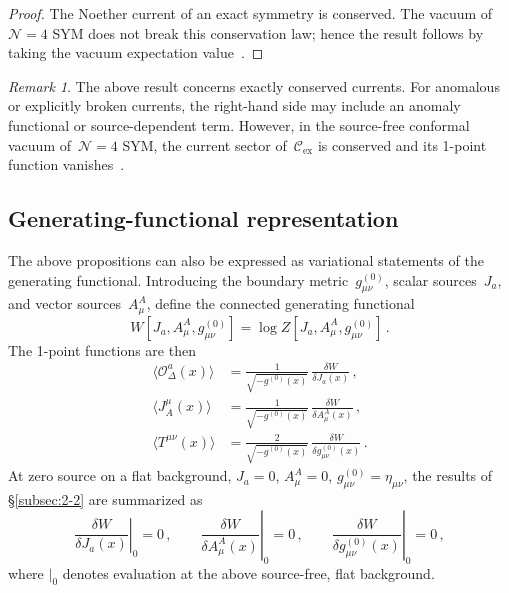 \documentclass[
  aps,
  prd,
  preprint,
  groupedaddress,
  nofootinbib,
  longbibliography
]{revtex4-2}
\theoremstyle{remark}
\newtheorem{remark}[definition]{Remark}
\newcommand{\Cex}{\mathcal{C}_{\mathrm{ex}}}
\newcommand{\N}{\mathcal{N}}
\begin{document}
\begin{proof}
The Noether current of an exact symmetry is conserved.
The vacuum of~$\N=4$ SYM does not break this conservation law;
hence the result follows by taking the vacuum expectation
value~\cite{ref4,ref6,ref7}.
\end{proof}

\begin{remark}\label{rem:anomalous-current}
The above result concerns exactly conserved currents.
For anomalous or explicitly broken currents, the right-hand side
may include an anomaly functional or source-dependent term.
However, in the source-free conformal vacuum of~$\N=4$ SYM,
the current sector of~$\Cex$ is conserved and its 1-point function
vanishes~\cite{ref4,ref6,ref7}.
\end{remark}

\subsection{Generating-functional representation}\label{subsec:2-3}

The above propositions can also be expressed as variational
statements of the generating functional.
Introducing the boundary metric~$g^{(0)}_{\mu\nu}$, scalar
sources~$J_a$, and vector sources~$A_\mu^A$, define the connected
generating functional~\cite{ref2,ref3,ref5}
\begin{equation}\label{eq:W-def}
  W[J_a,A_\mu^A,g^{(0)}_{\mu\nu}]
  = \log Z[J_a,A_\mu^A,g^{(0)}_{\mu\nu}]\,.
\end{equation}
The 1-point functions are then
\begin{align}
  \langle\mathcal{O}_\Delta^a(x)\rangle
  &= \frac{1}{\sqrt{-g^{(0)}(x)}}\,
     \frac{\delta W}{\delta J_a(x)}\,,
  \label{eq:1pt-scalar-W}\\
  \langle J_A^\mu(x)\rangle
  &= \frac{1}{\sqrt{-g^{(0)}(x)}}\,
     \frac{\delta W}{\delta A_\mu^A(x)}\,,
  \label{eq:1pt-current-W}\\
  \langle T^{\mu\nu}(x)\rangle
  &= \frac{2}{\sqrt{-g^{(0)}(x)}}\,
     \frac{\delta W}{\delta g^{(0)}_{\mu\nu}(x)}\,.
  \label{eq:1pt-Tmunu-W}
\end{align}
At zero source on a flat background,
$J_a=0$, $A_\mu^A=0$, $g^{(0)}_{\mu\nu}=\eta_{\mu\nu}$,
the results of \S\ref{subsec:2-2} are summarized as
\begin{equation}\label{eq:W-vanish}
  \left.\frac{\delta W}{\delta J_a(x)}\right|_0 = 0\,,\qquad
  \left.\frac{\delta W}{\delta A_\mu^A(x)}\right|_0 = 0\,,\qquad
  \left.\frac{\delta W}{\delta g^{(0)}_{\mu\nu}(x)}\right|_0 = 0\,,
\end{equation}
where $|_0$ denotes evaluation at the above source-free, flat
background.
\end{document}
